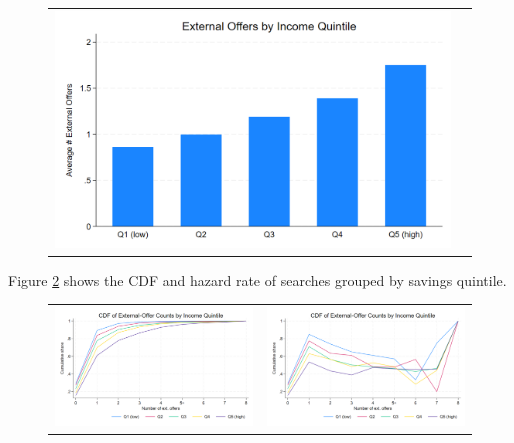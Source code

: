 \documentclass[12pt]{article}
\begin{document}
\begin{figure}[H]
\caption{}
\label{fig:ie3_3}
\centering{}%
\begin{tabular}{cc}
\includegraphics[scale=0.27]{../figures/IE3_search_by_income_quintile.png}
\end{tabular}
\end{figure}

Figure \ref{fig:ie3_4} shows the CDF and hazard rate of searches grouped by savings quintile. 

\begin{figure}[H] 
\caption{}
\label{fig:ie3_4}
\centering{}%
\begin{tabular}{cc}
\includegraphics[scale=0.26]{../figures/IE3_search_CDF_by_income_quintile.png} & \includegraphics[scale=0.26]{../figures/IE3_search_hazardrate_by_income_quintile.png}
\end{tabular}
\end{figure}
\end{document}
